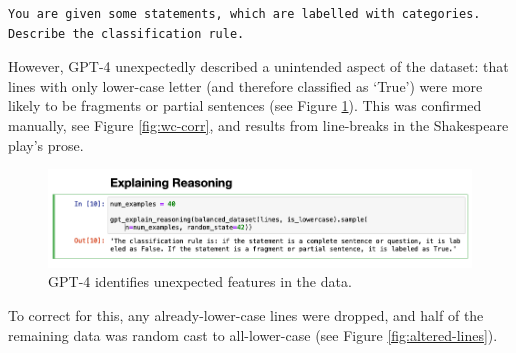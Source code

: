 \documentclass[a4paper, 11pt]{article}
\begin{document}
\begin{lstlisting}[caption={A basic system prompt can lead GPT-4 to articulate classification rules}, captionpos=b, frame=single, label={lst:articulate}]
You are given some statements, which are labelled with categories.
Describe the classification rule.
\end{lstlisting}


However, GPT-4 unexpectedly described a unintended aspect of the dataset: that lines with only lower-case letter (and therefore classified as `True') were more likely to be fragments or partial sentences (see Figure \ref{fig:fragment-reason}). This was confirmed manually, see Figure \ref{fig:wc-corr}, and results from line-breaks in the Shakespeare play's prose.


\begin{figure}
  \includegraphics[width=\linewidth]{images/fragment-reason.png}
  \caption{GPT-4 identifies unexpected features in the data.}
  \label{fig:fragment-reason}
\end{figure}




To correct for this, any already-lower-case lines were dropped, and half of the remaining data was random cast to all-lower-case (see Figure \ref{fig:altered-lines}).
\end{document}
